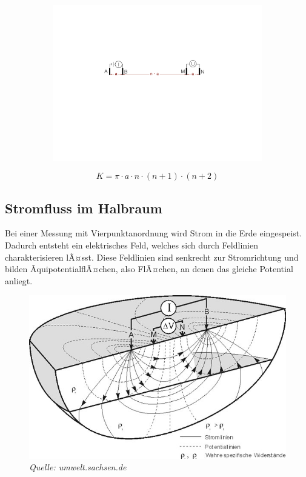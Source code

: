 \begin{figure}[H]
	\begin{subfigure}[m]{0.5\textwidth}
	\centering
		\includegraphics[scale = 0.35]{GeoelektrikBilder/DipolDipolAnordnung}
	\end{subfigure}
	\begin{subfigure}[m]{0.5\textwidth}
		\begin{equation*}
				K = \pi \cdot a \cdot n \cdot (n+1) \cdot (n+2)
		\end{equation*}
	\end{subfigure}
\end{figure}


\subsection{Stromfluss im Halbraum}
Bei einer Messung mit Vierpunktanordnung wird Strom in die Erde eingespeist. Dadurch entsteht ein elektrisches Feld, welches sich durch Feldlinien charakterisieren lÃ¤sst. Diese Feldlinien sind senkrecht zur Stromrichtung und bilden ÃquipotentialflÃ¤chen, also FlÃ¤chen, an denen das gleiche Potential anliegt.   

\begin{figure}[H]
	\centering
	\includegraphics[width = \textwidth]{GeoelektrikBilder/EFeldErde}	
	\caption*{\textsl{Quelle: umwelt.sachsen.de}}
\end{figure}

 




